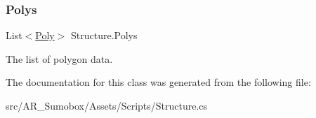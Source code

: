 \subsubsection{\texorpdfstring{Polys}{Polys}}
{\footnotesize\ttfamily List$<$\mbox{\hyperlink{struct_poly}{Poly}}$>$ Structure.\+Polys}



The list of polygon data. 



The documentation for this class was generated from the following file\+:\begin{DoxyCompactItemize}
\item 
src/\+A\+R\+\_\+\+Sumobox/\+Assets/\+Scripts/Structure.\+cs\end{DoxyCompactItemize}
